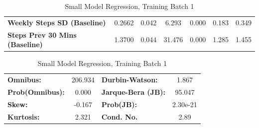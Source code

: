 \begin{table}
\begin{tabular}{lcccccc}
\textbf{Weekly Steps SD (Baseline)}    &       0.2662  &        0.042     &     6.293  &         0.000        &        0.183    &        0.349     \\
\textbf{Steps Prev 30 Mins (Baseline)} &       1.3700  &        0.044     &    31.476  &         0.000        &        1.285    &        1.455     \\
\bottomrule
\end{tabular}
\begin{tabular}{lclc}
\textbf{Omnibus:}       & 206.934 & \textbf{  Durbin-Watson:     } &    1.867  \\
\textbf{Prob(Omnibus):} &   0.000 & \textbf{  Jarque-Bera (JB):  } &   95.047  \\
\textbf{Skew:}          &  -0.167 & \textbf{  Prob(JB):          } & 2.30e-21  \\
\textbf{Kurtosis:}      &   2.321 & \textbf{  Cond. No.          } &     2.89  \\
\bottomrule
\end{tabular}
\caption{Small Model Regression, Training Batch 1}
\end{table}

\medskip

